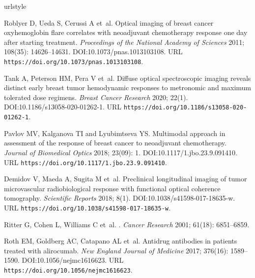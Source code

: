 \documentclass[Royal,times,doublespace,sagev]{sagej}
\begin{document}
\begin{thebibliography}{10}
\providecommand{\url}[1]{\texttt{#1}}
\providecommand{\urlprefix}{URL }
\expandafter\ifx\csname urlstyle\endcsname\relax
  \providecommand{\doi}[1]{DOI:\discretionary{}{}{}#1}\else
  \providecommand{\doi}{DOI:\discretionary{}{}{}\begingroup
  \urlstyle{rm}\Url}\fi
\providecommand{\eprint}[2][]{\url{#2}}

Roblyer D, Ueda S, Cerussi A et~al.
\newblock Optical imaging of breast cancer oxyhemoglobin flare correlates with
  neoadjuvant chemotherapy response one day after starting treatment.
\newblock \emph{Proceedings of the National Academy of Sciences} 2011; 108(35):
  14626--14631.
\newblock \doi{10.1073/pnas.1013103108}.
\newblock \urlprefix\url{https://doi.org/10.1073/pnas.1013103108}.

Tank A, Peterson HM, Pera V et~al.
\newblock Diffuse optical spectroscopic imaging reveals distinct early breast
  tumor hemodynamic responses to metronomic and maximum tolerated dose
  regimens.
\newblock \emph{Breast Cancer Research} 2020; 22(1).
\newblock \doi{10.1186/s13058-020-01262-1}.
\newblock \urlprefix\url{https://doi.org/10.1186/s13058-020-01262-1}.

Pavlov MV, Kalganova TI and Lyubimtseva YS.
\newblock Multimodal approach in assessment of the response of breast cancer to
  neoadjuvant chemotherapy.
\newblock \emph{Journal of Biomedical Optics} 2018; 23(09): 1.
\newblock \doi{10.1117/1.jbo.23.9.091410}.
\newblock \urlprefix\url{https://doi.org/10.1117/1.jbo.23.9.091410}.

Demidov V, Maeda A, Sugita M et~al.
\newblock Preclinical longitudinal imaging of tumor microvascular
  radiobiological response with functional optical coherence tomography.
\newblock \emph{Scientific Reports} 2018; 8(1).
\newblock \doi{10.1038/s41598-017-18635-w}.
\newblock \urlprefix\url{https://doi.org/10.1038/s41598-017-18635-w}.

Ritter G, Cohen L, Williams C et~al.
.
\newblock \emph{{Cancer Research}} {2001}; {61}({18}): {6851--6859}.

Roth EM, Goldberg AC, Catapano AL et~al.
\newblock Antidrug antibodies in patients treated with alirocumab.
\newblock \emph{New England Journal of Medicine} 2017; 376(16): 1589--1590.
\newblock \doi{10.1056/nejmc1616623}.
\newblock \urlprefix\url{https://doi.org/10.1056/nejmc1616623}.


\end{thebibliography}
\end{document}
